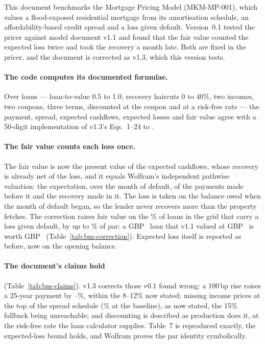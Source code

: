 \documentclass[11pt,a4paper]{article}
\begin{document}
\sloppy

\mkmtitlepage
\mkmlegalpage

\tableofcontents
\clearpage

\mkmexecsummary

This document benchmarks the Mortgage Pricing Model (MKM-MP-001), which values a
flood-exposed residential mortgage from its amortisation schedule, an
affordability-based credit spread and a loss given default. Version~0.1 tested the
pricer against model document v1.1 and found that the fair value counted the expected
loss twice and took the recovery a month late. Both are fixed in the pricer, and the
document is corrected as v1.3, which this version tests.

\paragraph{The code computes its documented formulae.} Over \bmCases{} loans ---
loan-to-value 0.5 to 1.0, recovery haircuts 0 to 40\%, two incomes, two coupons,
three terms, discounted at the coupon and at a risk-free rate --- the payment, spread,
expected cashflows, expected losses and fair value agree with a 50-digit
implementation of v1.3's Eqs.~1--24 to \bmCodeErr. \bmWolframConfirms

\paragraph{The fair value counts each loss once.} The fair value is now the present
value of the expected cashflows, whose recovery is already net of the loss, and it
equals Wolfram's independent pathwise valuation: the expectation, over the month of
default, of the payments made before it and the recovery made in it. The loss is
taken on the balance owed when the month of default began, so the lender never
recovers more than the property fetches. The correction raises fair value on the
\bmCorrectionShare\% of loans in the grid that carry a loss given default, by up to
\bmCorrection\% of par: a GBP~\bmWorstLoan{} loan that v1.1 valued at
GBP~\bmWorstOld{} is worth GBP~\bmWorstNew{} (Table~\ref{tab:bm-correction}).
Expected loss itself is reported as before, now on the opening balance.

\paragraph{The document's claims hold} (Table~\ref{tab:bm-claims}). v1.3 corrects
those v0.1 found wrong: a 100\,bp rise raises a 25-year payment by
\bmPayLow--\bmPayHigh\%, within the 8--12\% now stated; missing income prices at the
top of the spread schedule (\bmZeroIncome\% at the baseline), as now stated, the
15\% fallback being unreachable; and discounting is described as production does it,
at the risk-free rate the loan calculator supplies. Table~7 is reproduced exactly,
the expected-loss bound holds, and Wolfram proves the par identity symbolically.
\end{document}
